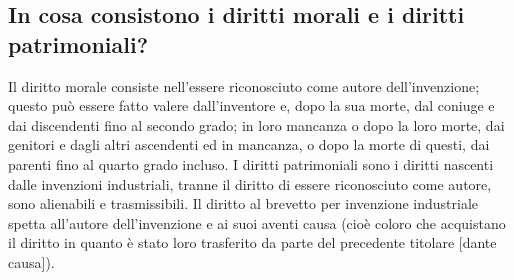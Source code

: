 \subsection{In cosa consistono i diritti morali e i diritti patrimoniali?}
Il diritto morale consiste nell'essere riconosciuto come autore dell'invenzione; questo può essere fatto valere
dall'inventore e, dopo la sua morte, dal coniuge e dai discendenti fino al secondo grado; in loro mancanza o dopo
la loro morte, dai genitori e dagli altri ascendenti ed in mancanza, o dopo la morte di questi, dai parenti fino al quarto
grado incluso. \newline
I diritti patrimoniali sono i diritti nascenti dalle invenzioni industriali, tranne il diritto di essere riconosciuto come
autore, sono alienabili e trasmissibili.\newline
Il diritto al brevetto per invenzione industriale spetta all'autore dell'invenzione e ai suoi aventi causa (cioè coloro che acquistano il diritto
in quanto è stato loro trasferito da parte del precedente titolare [dante causa]).

